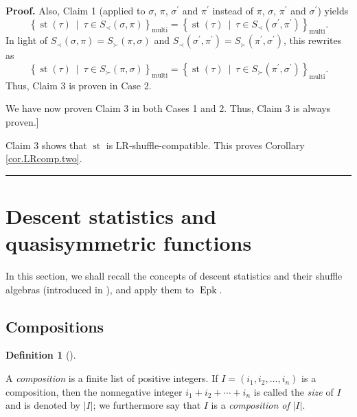 \documentclass[numbers=enddot,12pt,final,onecolumn,notitlepage]{scrartcl}%
\theoremstyle{definition}
\newtheorem{defi}[theo]{Definition}
\newenvironment{definition}[1][]
{\begin{defi}[#1]\begin{leftbar}}
{\end{leftbar}\end{defi}}
\newenvironment{proof}[1][Proof]{\noindent\textbf{#1.} }{\ \rule{0.5em}{0.5em}}
\newenvironment{verlong}{}{}
\begin{document}
\begin{verlong}
\begin{proof}
Also, Claim 1 (applied to $\sigma$, $\pi$, $\sigma^{\prime}$ and $\pi^{\prime
}$ instead of $\pi$, $\sigma$, $\pi^{\prime}$ and $\sigma^{\prime}$) yields%
\[
\left\{  \operatorname*{st}\left(  \tau\right)  \ \mid\ \tau\in S_{\prec
}\left(  \sigma,\pi\right)  \right\}  _{\operatorname*{multi}}=\left\{
\operatorname*{st}\left(  \tau\right)  \ \mid\ \tau\in S_{\prec}\left(
\sigma^{\prime},\pi^{\prime}\right)  \right\}  _{\operatorname*{multi}}.
\]
In light of $S_{\prec}\left(  \sigma,\pi\right)  =S_{\succ}\left(  \pi
,\sigma\right)  $ and $S_{\prec}\left(  \sigma^{\prime},\pi^{\prime}\right)
=S_{\succ}\left(  \pi^{\prime},\sigma^{\prime}\right)  $, this rewrites as%
\[
\left\{  \operatorname*{st}\left(  \tau\right)  \ \mid\ \tau\in S_{\succ
}\left(  \pi,\sigma\right)  \right\}  _{\operatorname*{multi}}=\left\{
\operatorname*{st}\left(  \tau\right)  \ \mid\ \tau\in S_{\succ}\left(
\pi^{\prime},\sigma^{\prime}\right)  \right\}  _{\operatorname*{multi}}.
\]
Thus, Claim 3 is proven in Case 2.

We have now proven Claim 3 in both Cases 1 and 2. Thus, Claim 3 is always proven.]

Claim 3 shows that $\operatorname*{st}$ is LR-shuffle-compatible. This proves
Corollary \ref{cor.LRcomp.two}.
\end{proof}
\end{verlong}

\section{\label{sect.Descent}Descent statistics and quasisymmetric functions}

In this section, we shall recall the concepts of descent statistics and their
shuffle algebras (introduced in \cite{part1}), and apply them to
$\operatorname*{Epk}$.

\subsection{Compositions}

\begin{definition}
A \textit{composition} is a finite list of positive integers. If $I=\left(
i_{1},i_{2},\ldots,i_{n}\right)  $ is a composition, then the nonnegative
integer $i_{1}+i_{2}+\cdots+i_{n}$ is called the \textit{size} of $I$ and is
denoted by $\left\vert I\right\vert $; we furthermore say that $I$ is a
\textit{composition of }$\left\vert I\right\vert $.
\end{definition}
\end{document}
